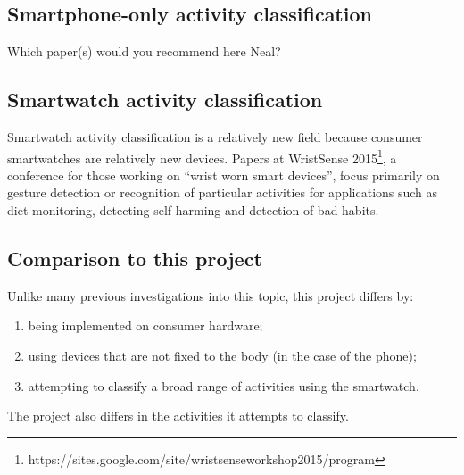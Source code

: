     \subsection{Smartphone-only activity classification}
      Which paper(s) would you recommend here Neal?
    \subsection{Smartwatch activity classification}
      Smartwatch activity classification is a relatively new field because consumer smartwatches are relatively new devices. Papers at WristSense 2015\footnote{https://sites.google.com/site/wristsenseworkshop2015/program}, a conference for those working on ``wrist worn smart devices'', focus primarily on gesture detection or recognition of particular activities for applications such as diet monitoring, detecting self-harming and detection of bad habits. 
    \subsection{Comparison to this project}
      Unlike many previous investigations into this topic, this project differs by:
        \begin{enumerate}
          \item being implemented on consumer hardware;
          \item using devices that are not fixed to the body (in the case of the phone);
          \item attempting to classify a broad range of activities using the smartwatch.
        \end{enumerate}
      
      The project also differs in the activities it attempts to classify.
    
    
